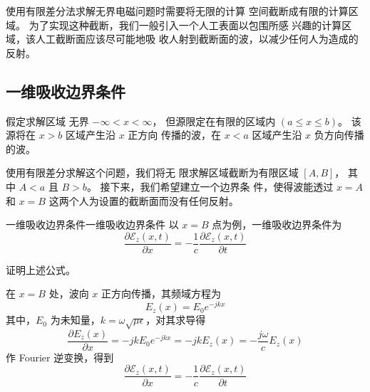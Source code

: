 \par 使用有限差分法求解无界电磁问题时需要将无限的计算
空间截断成有限的计算区域。
为了实现这种截断，我们一般引入一个人工表面以包围所感
兴趣的计算区域，该人工截断面应该尽可能地吸
收人射到截断面的波，以减少任何人为造成的反射。

\subsection{一维吸收边界条件}

\par 假定求解区域
无界 $-\infty<x<\infty$，
但源限定在有限的区域内 $(a\leq x \leq b)$。
该源将在 $x>b$ 区域产生沿 $x$ 正方向
传播的波，在 $x<a$ 区域产生沿 $x$ 负方向传播的波。

\par 使用有限差分求解这个问题，我们将无
限求解区域截断为有限区域 $[A,B]$，
其中 $A<a$ 且 $B>b$。
接下来，我们希望建立一个边界条
件，使得波能透过 $x=A$ 和 $x=B$ 这两个人为设置的截断面而没有任何反射。

\begin{theorem}{一维吸收边界条件}{一维吸收边界条件}
    以 $x=B$ 点为例，一维吸收边界条件为
    \begin{equation}
        \frac{\partial \mathscr{E}_z(x,t)}{\partial x}
        =-\frac{1}{c}\frac{\partial \mathscr{E}_z(x,t)}{\partial t}
    \end{equation}
\end{theorem}

\begin{exercise}
    证明上述公式。
\end{exercise}

\begin{solution}
    在 $x=B$ 处，波向 $x$ 正方向传播，其频域方程为
    \begin{equation*}
        E_z(x)=E_0e^{-jkx}
    \end{equation*}
    其中，$E_0$ 为未知量，$k=\omega\sqrt{\mu \epsilon}$，对其求导得
    \begin{equation*}
        \frac{\partial E_z(x)}{\partial x}=-jkE_0e^{-jkx}=-jkE_z(x)
        =-\frac{j\omega}{c}E_z(x)
    \end{equation*}
    作 Fourier 逆变换，得到
    \begin{equation*}
        \frac{\partial \mathscr{E}_z(x,t)}{\partial x}
        =-\frac{1}{c}\frac{\partial \mathscr{E}_z(x,t)}{\partial t}
    \end{equation*}
\end{solution}


